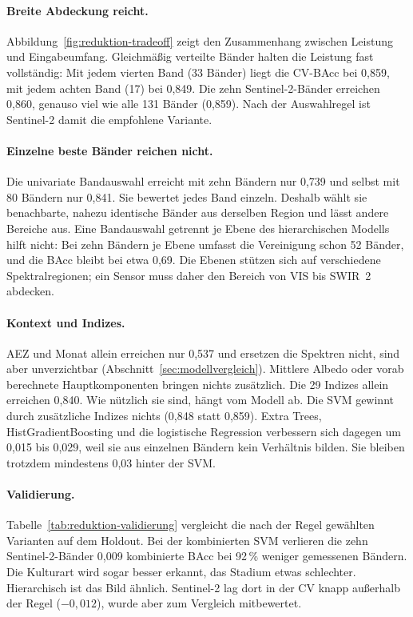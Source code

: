 \documentclass[11pt,a4paper,titlepage]{article}
\begin{document}
\paragraph{Breite Abdeckung reicht.}
Abbildung~\ref{fig:reduktion-tradeoff} zeigt den Zusammenhang zwischen
Leistung und Eingabeumfang. Gleichm\"a\ss{}ig verteilte B\"ander halten die
Leistung fast vollst\"andig: Mit jedem vierten Band (33 B\"ander) liegt die
CV-BAcc bei 0,859, mit jedem achten Band (17) bei 0,849. Die zehn
Sentinel-2-B\"ander erreichen 0,860, genauso viel wie alle 131 B\"ander
(0,859). Nach der Auswahlregel ist Sentinel-2 damit die empfohlene Variante.

\paragraph{Einzelne \glqq beste\grqq{} B\"ander reichen nicht.}
Die univariate Bandauswahl erreicht mit zehn B\"andern nur 0,739 und selbst
mit 80 B\"andern nur 0,841. Sie bewertet jedes Band einzeln. Deshalb w\"ahlt
sie benachbarte, nahezu identische B\"ander aus derselben Region und l\"asst
andere Bereiche aus. Eine Bandauswahl getrennt je Ebene des hierarchischen
Modells hilft nicht: Bei zehn B\"andern je Ebene umfasst die Vereinigung
schon 52 B\"ander, und die BAcc bleibt bei etwa 0,69. Die Ebenen st\"utzen
sich auf verschiedene Spektralregionen; ein Sensor muss daher den Bereich von
VIS bis SWIR~2 abdecken.

\paragraph{Kontext und Indizes.}
AEZ und Monat allein erreichen nur 0,537 und ersetzen die Spektren nicht,
sind aber unverzichtbar (Abschnitt~\ref{sec:modellvergleich}). Mittlere Albedo oder vorab berechnete Hauptkomponenten bringen nichts
zus\"atzlich. Die 29 Indizes allein erreichen 0,840.
Wie n\"utzlich sie sind, h\"angt vom Modell ab. Die SVM gewinnt durch
zus\"atzliche Indizes nichts (0,848 statt 0,859). Extra Trees,
HistGradientBoosting und die logistische Regression verbessern sich dagegen
um 0,015 bis 0,029, weil sie aus einzelnen B\"andern kein Verh\"altnis
bilden. Sie bleiben trotzdem mindestens 0,03 hinter der SVM.

\paragraph{Validierung.}
Tabelle~\ref{tab:reduktion-validierung} vergleicht die nach der Regel
gew\"ahlten Varianten auf dem Holdout. Bei der kombinierten SVM verlieren
die zehn Sentinel-2-B\"ander 0,009 kombinierte BAcc bei 92\,\% weniger
gemessenen B\"andern. Die Kulturart wird sogar besser erkannt, das Stadium
etwas schlechter. Hierarchisch ist das Bild \"ahnlich. Sentinel-2 lag dort
in der CV knapp au\ss{}erhalb der Regel ($-0{,}012$), wurde aber zum
Vergleich mitbewertet.
\end{document}
